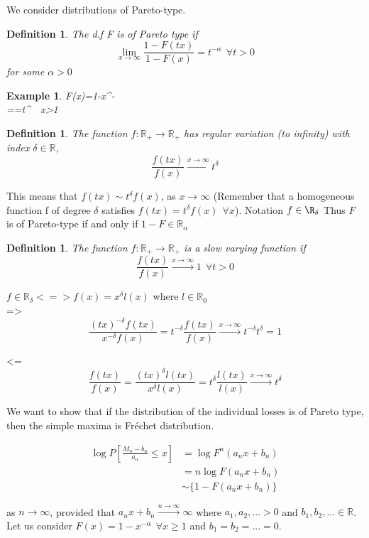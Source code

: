 \documentclass[11pt,a4paper,oneside]{article}
\newtheorem{exm}{Example}[subsection]
\newtheorem{defi}[subsection]{Definition}
\begin{document}
We consider distributions of Pareto-type.
\begin{defi}
The d.f F is of Pareto type if $$\lim_{x\rightarrow\infty}\frac{1-F(tx)}{1-F(x)}=t^{-\alpha}\ \ \forall t>0$$
for some $\alpha>0$
\end{defi}

\begin{exm}
F(x)=1-x^{-\alpha}\\
==t^{\alpha}\ \ \forall x>1
\end{exm}


\begin{defi}
The function $f:\mathbb{R}_{+}\rightarrow \mathbb{R}_{+}$ has regular variation (to infinity) with index $\delta\in\mathbb{R}$,
$$\frac{f(tx)}{f(x)}\xrightarrow{x\rightarrow\infty}t^{\delta}$$
\end{defi}
This means that $f(tx)\sim t^{\delta}f(x)$, as $x\rightarrow\infty$ (Remember that a homogeneous function f of degree $\delta$ satisfies $f(tx)=t^{\delta}f(x)\ \ \forall x$).
 Notation $f\in\R_{\delta}$ Thus $F$ is of Pareto-type if and only if $1-F\in\mathbb{R}_{\alpha}$
 
 \begin{defi}
 The function $f:\mathbb{R}_+\rightarrow\mathbb{R}_+$ is a slow varying function if
 $$\frac{f(tx)}{f(x)}\xrightarrow{x\rightarrow\infty}1\ \ \forall t>0$$
 \end{defi}
 
 $f\in\mathbb{R}_{\delta}<=> f(x)=x^{\delta}l(x)$ where $l\in\mathbb{R}_0$\\
 =>
$$\frac{(tx)^{-\delta}f(tx)}{x^{-\delta}f(x)}=t^{-\delta}\frac{f(tx)}{f(x)}\xrightarrow{x\rightarrow\infty}t^{-\delta}t^{\delta}=1$$
  
  <=
 $$\frac{f(tx)}{f(x)}
  =\frac{(tx)^{\delta}l(tx)}{x^{\delta}l(x)}
 =t^{\delta}\frac{l(tx)}{l(x)}\xrightarrow{x\rightarrow\infty}t^{\delta}
$$

We want to show that if the distribution of the individual losses is of Pareto type, then the simple maxima is Fréchet distribution.

\begin{align*}
\log P\left[\frac{M_n-b_n}{a_n}\leq x\right] &= \log F^n(a_nx+b_n)\\
&=n\log F(a_nx+b_n)\\
&\sim\{1-F(a_nx+b_n)\}
\end{align*}

as $n\rightarrow \infty$, provided that $a_nx+b_n\xrightarrow{n\rightarrow\infty}\infty$ where
$a_1,a_2,...>0$ and $b_1,b_2,...\in\mathbb{R}$. Let us consider $F(x)=1-x^{-\alpha}\ \ \forall x \geq 1$ and $b_1=b_2=...=0$.
\end{document}
